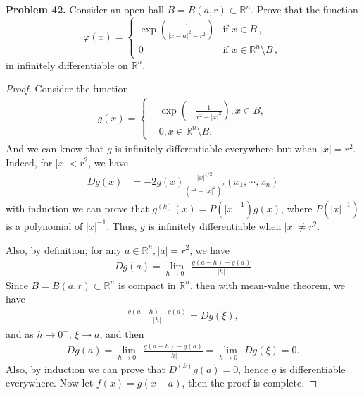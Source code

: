 \documentclass[12pt,leqno]{amsart}
\theoremstyle{definition}
\begin{document}
\noindent
{\bf Problem 42.}
Consider an open ball $B=B(a,r)\subset\mathbb{R}^n$. Prove that the function
$$
\varphi(x)
          = \left\{\begin{array}{ccc}
            \exp\left(\frac{1}{|x-a|^2-r^2}\right)       &  \mbox{if $x\in B$}\, , \\
             0     &  \mbox{if $x\in \mathbb{R}^n\setminus B$}\, ,
               \end{array}
        \right.
$$
in infinitely differentiable on $\mathbb{R}^n$.
\begin{proof}
Consider the function 
\begin{align*}
    g(x) = \left\{
        \begin{aligned}
        & \exp \left(- \frac{1}{r^2 - |x|^2}\right), x\in B, \\
        & 0, x\in \mathbb{R}^n\setminus B,
        \end{aligned}
    \right.
\end{align*}
And we can know that $g$ is infinitely differentiable everywhere but when $|x| = r^2$. Indeed, for $|x| < r^2$, we have
\begin{align*}
    Dg(x) & = - 2 g(x) \frac{|x|^{1/2}}{(r^2 - |x|^2)^2} \left(x_1,\cdots,x_n \right)
\end{align*}
with induction we can prove that $g^{(k)}(x) = P\left(|x|^{-1}\right)g(x)$, where $P\left(|x|^{-1}\right)$ is a polynomial of $|x|^{-1}$. Thus, $g$ is infinitely differentiable when $|x| \neq r^2$.

Also, by definition, for any $a \in \mathbb{R}^n, |a| = r^2$, we have
\begin{align*}
    Dg(a) = \lim_{h\to 0^-} \frac{g(a - h) - g(a)}{|h|}
\end{align*}
Since $B = B(a,r)\subset\mathbb{R}^n$ is compact in $\mathbb{R}^n$, then with mean-value theorem, we have 
\begin{align*}
    \frac{g(a - h) - g(a)}{|h|} = Dg(\xi),
\end{align*}
and as $h\to 0^-$, $\xi \to a$, and then
\begin{align*}
    Dg(a) = \lim_{h\to 0^-} \frac{g(a - h) - g(a)}{|h|} = \lim_{h\to 0^-} Dg(\xi) = 0.
\end{align*}
Also, by induction we can prove that $D^{(k)}g(a) = 0$, hence $g$ is differentiable everywhere. Now let $f(x) = g(x-a)$, then the proof is complete.
\end{proof}

\medskip
\end{document}

